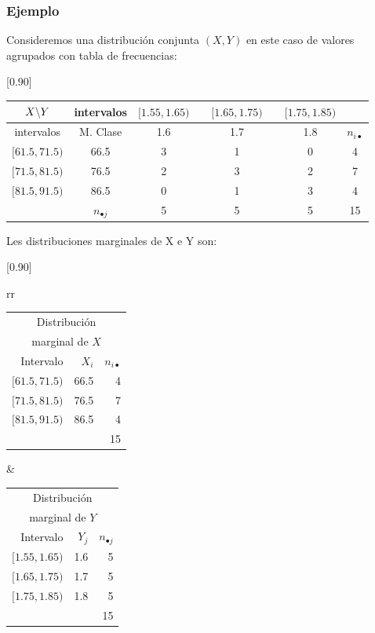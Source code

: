 \begin{frame}
\frametitle{Ejemplo}
Consideremos una distribución conjunta $(X,Y)$ en este caso de valores agrupados con
tabla de frecuencias: 
\begin{center}%
\scalebox{0.90}[0.90]{
\begin{tabular}{|c|c|ccccc|c|}
\cline{1-7} $X  \mbox{\mbox{\textbackslash}}Y$ & intervalos & \multicolumn{1}{c}{$[1.55,1.65)$} &\vrule &
\multicolumn{1}{c}{$[1.65, 1.75)$} &\vrule &
 \multicolumn{1}{c|}{$[1.75, 1.85)$} &\multicolumn{1}{c}{}\\
\hline intervalos & M. Clase & \multicolumn{1}{c}{1.6} &\vrule & \multicolumn{1}{c}{1.7}
&\vrule & \multicolumn{1}{c|}{1.8} & $n_{i\bullet}$ \\
 \hline
$[61.5, 71.5)$ & 66.5 & 3 && 1 && 0 & 4 \\ $[71.5, 81.5)$ & 76.5 & 2 && 3 && 2 & 7 \\
$[81.5, 91.5)$ & 86.5 & 0 && 1 && 3 & 4 \\ \hline \multicolumn{1}{c|}{} & $n_{\bullet j}$
& 5 && 5 && 5 & 15 \\ \cline{2-8}
\end{tabular}}
\end{center}
\end{frame}

\begin{frame}

Les distribuciones marginales de X e Y son: 

\begin{table}
\scalebox{0.9}[0.90]{
\begin{tabular}{rr}
{\begin{tabular}{r|rr} \multicolumn{3}{c}{Distribución} \\
 \multicolumn{3}{c}{marginal de $X$}\\
\hline Intervalo   &  $X_i$   &  $n_{i\bullet}$ \\ \hline $[61.5,71.5)$  & 66.5  &    4
\\ $[71.5,81.5)$  &    76.5  &    7 \\ $[81.5,91.5)$  &     86.5  &    4
\\ \hline
       &                   &    15
\end{tabular}} &
{\begin{tabular}{r|rr} \multicolumn{3}{c}{Distribución}\\ \multicolumn{3}{c}{marginal de
$Y$}\\ \hline Intervalo   &  $Y_j$   & $n_{\bullet j}$ \\ \hline $[1.55,1.65)$  &     1.6
&    5 \\ $[1.65,1.75) $  &    1.7  & 5 \\ $[1.75,1.85)$  & 1.8  &    5    \\ \hline
       &                   &    15
\end{tabular}}
\end{tabular}}
\end{table}
\end{frame}


